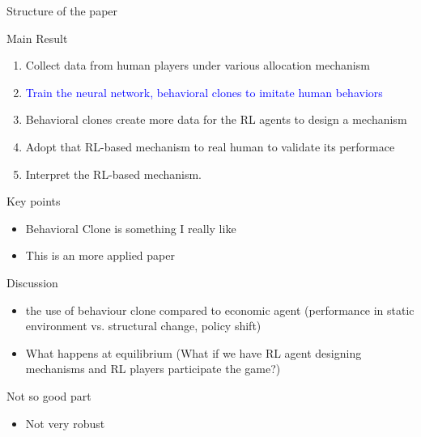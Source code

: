 \documentclass[aspectratio=169]{beamer} %
\begin{document}
\begin{frame}{Structure of the paper}
    
\end{frame}


\begin{frame}{Main Result}
\begin{enumerate}
    \item Collect data from human players under various allocation mechanism
    \item \textcolor{blue}{Train the neural network, behavioral clones to imitate human behaviors}
    \item Behavioral clones create more data for the RL agents to design a mechanism 
    \item Adopt that RL-based mechanism to real human to validate its performace
    \item Interpret the RL-based mechanism.
\end{enumerate}
\end{frame}

\begin{frame}{Key points}
\begin{itemize}
    \item Behavioral Clone is something I really like
    \item This is an more applied paper 
\end{itemize}
    
\end{frame}



\begin{frame}{Discussion}
\begin{itemize}
    \item the use of behaviour clone compared to economic agent (performance in static environment vs. structural change, policy shift)
    \item What happens at equilibrium (What if we have RL agent designing mechanisms and RL players participate the game?)
\end{itemize}
    
\end{frame}


\begin{frame}{Not so good part}
\begin{itemize}
    \item Not very robust 
\end{itemize}
    
\end{frame}
\end{document}
